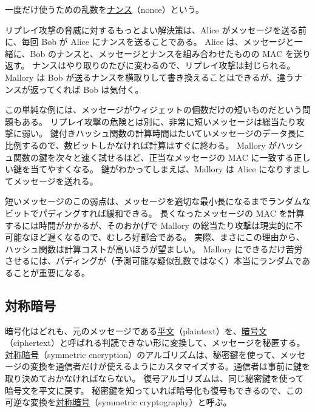 \documentclass[uplatex]{jsarticle}
\def\label#1{}%
\begin{document}
\begin{dfn}[ナンス]\label{dfn:ch5-nonce}
一度だけ使うための乱数を\underline{ナンス}（nonce）という。
\end{dfn}

\begin{exa}[ナンスによる修正]\label{exa:ch5-nonce-fix}
リプレイ攻撃の脅威に対するもっとよい解決策は、Alice がメッセージを送る前に、毎回 Bob が Alice にナンスを送ることである。
Alice は、メッセージと一緒に、Bob のナンスと、メッセージとナンスを組み合わせたものの MAC を送り返す。
ナンスはやり取りのたびに変わるので、リプレイ攻撃は封じられる。
Mallory は Bob が送るナンスを横取りして書き換えることはできるが、違うナンスが返ってくれば Bob は気付く。
\end{exa}

この単純な例には、メッセージがウィジェットの個数だけの短いものだという問題もある。
リプレイ攻撃の危険とは別に、非常に短いメッセージは総当たり攻撃に弱い。
鍵付きハッシュ関数の計算時間はたいていメッセージのデータ長に比例するので、数ビットしかなければ計算はすぐに終わる。
Mallory がハッシュ関数の鍵を次々と速く試せるほど、正当なメッセージの MAC に一致する正しい鍵を当てやすくなる。
鍵がわかってしまえば、Mallory は Alice になりすましてメッセージを送れる。

短いメッセージのこの弱点は、メッセージを適切な最小長になるまでランダムなビットでパディングすれば緩和できる。
長くなったメッセージの MAC を計算するには時間がかかるが、そのおかげで Mallory の総当たり攻撃は現実的に不可能なほど遅くなるので、むしろ好都合である。
実際、まさにこの理由から、ハッシュ関数は計算コストが高いほうが望ましい。
Mallory にできるだけ苦労させるには、パディングが（予測可能な疑似乱数ではなく）本当にランダムであることが重要になる。

\subsection{対称暗号}

\begin{dfn}\label{dfn:ch5-symmetric-encryption}
暗号化はどれも、元のメッセージである\underline{平文}（plaintext）を、\underline{暗号文}（ciphertext）と呼ばれる判読できない形に変換して、メッセージを秘匿する。
\underline{対称暗号}（symmetric encryption）のアルゴリズムは、秘密鍵を使って、メッセージの変換を通信者だけが使えるようにカスタマイズする。通信者は事前に鍵を取り決めておかなければならない。
復号アルゴリズムは、同じ秘密鍵を使って暗号文を平文に戻す。
秘密鍵を知っていれば暗号化も復号もできるので、この可逆な変換を\underline{対称暗号}（symmetric cryptography）と呼ぶ。
\end{dfn}
\end{document}
